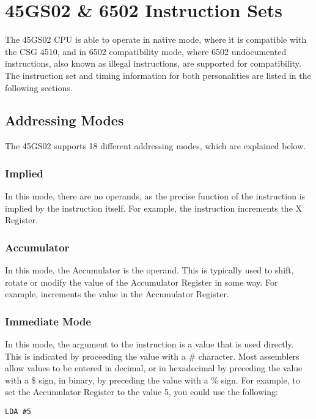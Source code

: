 \chapter{45GS02 \& 6502 Instruction Sets}

The 45GS02 CPU is able to operate in native mode, where it
is compatible with the CSG 4510, and in 6502 compatibility mode,
where 6502 undocumented instructions, also known as illegal
instructions, are supported for compatibility.  The instruction set and
timing information for both personalities are listed in the following
sections.

\section{Addressing Modes}

The 45GS02 supports 18 different addressing modes, which are explained below.

\subsection{Implied}

In this mode, there are no operands, as the precise function of the instruction is
implied by the instruction itself.  For example, the  instruction increments
the X Register.

\subsection{Accumulator}

In this mode, the Accumulator is the operand. This is typically used to shift,
rotate or modify the value of the Accumulator Register in some way.  For example,
 increments the value in the Accumulator Register.

\subsection{Immediate Mode}

In this mode, the argument to the instruction is a value that is used directly.
This is indicated by proceeding the value with a \# character. Most assemblers allow
values to be entered in decimal, or in hexadecimal by preceding the value with a \$ sign,
in binary, by preceding the value with a \% sign.  For example, to set the Accumulator
Register to the value 5, you could use the following:

\begin{tcolorbox}[colback=black,coltext=white]
\verbatimfont{\codefont}
\begin{verbatim}
LDA #5
\end{verbatim}
\end{tcolorbox}


